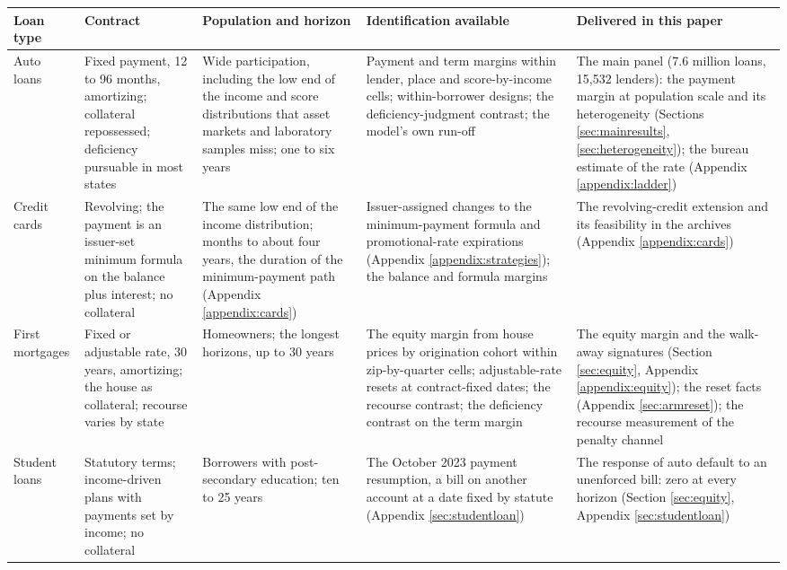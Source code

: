 \begin{tabularx}{0.96\textheight}{@{}>{\raggedright\arraybackslash}p{1.7cm}>{\raggedright\arraybackslash}X>{\raggedright\arraybackslash}X>{\raggedright\arraybackslash}X>{\raggedright\arraybackslash}X@{}}
\toprule
Loan type & Contract & Population and horizon & Identification available & Delivered in this paper \\
\midrule
Auto loans & Fixed payment, 12 to 96 months, amortizing; collateral repossessed; deficiency pursuable in most states & Wide participation, including the low end of the income and score distributions that asset markets and laboratory samples miss; one to six years & Payment and term margins within lender, place and score-by-income cells; within-borrower designs; the deficiency-judgment contrast; the model's own run-off & The main panel (7.6 million loans, 15,532 lenders): the payment margin at population scale and its heterogeneity (Sections \ref{sec:mainresults}, \ref{sec:heterogeneity}); the bureau estimate of the rate (Appendix \ref{appendix:ladder}) \\
Credit cards & Revolving; the payment is an issuer-set minimum formula on the balance plus interest; no collateral & The same low end of the income distribution; months to about four years, the duration of the minimum-payment path (Appendix \ref{appendix:cards}) & Issuer-assigned changes to the minimum-payment formula and promotional-rate expirations (Appendix \ref{appendix:strategies}); the balance and formula margins & The revolving-credit extension and its feasibility in the archives (Appendix \ref{appendix:cards}) \\
First mortgages & Fixed or adjustable rate, 30 years, amortizing; the house as collateral; recourse varies by state & Homeowners; the longest horizons, up to 30 years & The equity margin from house prices by origination cohort within zip-by-quarter cells; adjustable-rate resets at contract-fixed dates; the recourse contrast; the deficiency contrast on the term margin & The equity margin and the walk-away signatures (Section \ref{sec:equity}, Appendix \ref{appendix:equity}); the reset facts (Appendix \ref{sec:armreset}); the recourse measurement of the penalty channel \\
Student loans & Statutory terms; income-driven plans with payments set by income; no collateral & Borrowers with post-secondary education; ten to 25 years & The October 2023 payment resumption, a bill on another account at a date fixed by statute (Appendix \ref{sec:studentloan}) & The response of auto default to an unenforced bill: zero at every horizon (Section \ref{sec:equity}, Appendix \ref{sec:studentloan}) \\

\end{tabularx}
